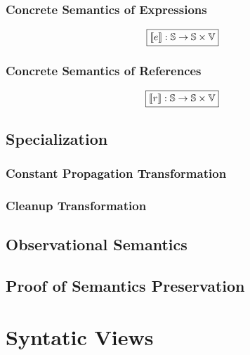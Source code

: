 \subsubsection{Concrete Semantics of Expressions}

\[
  \framebox{$\sem{\expr}: \stset \rightarrow \stset \times \valset$}
\]

\todo



\subsubsection{Concrete Semantics of References}

\[
  \framebox{$\sem{\refer}: \stset \rightarrow \stset \times \valset$}
\]

\todo





\subsection{Specialization}

\todo

\subsubsection{Constant Propagation Transformation}

\todo

\subsubsection{Cleanup Transformation}

\todo




\subsection{Observational Semantics}

\todo





\subsection{Proof of Semantics Preservation}

\todo




\section{Syntatic Views}

\todo
